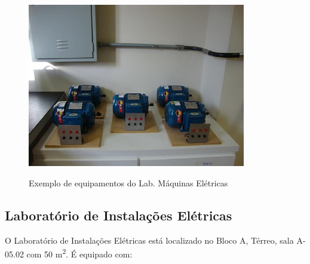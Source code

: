 \begin{figure}[!htb]
    \centering
    \caption{Exemplo de equipamentos do Lab. Máquinas Elétricas}
    \includegraphics[width=0.85\textwidth]{Caps/Figs/lab005.01c.png}
    \fonte{\utf}
    \label{fig:lab005.01c}
\end{figure}

\subsection{Laboratório de Instalações Elétricas}

O Laboratório de Instalações Elétricas está localizado no Bloco A, Térreo, sala A-05.02 com 50 m\textsuperscript{2}. É equipado com:

